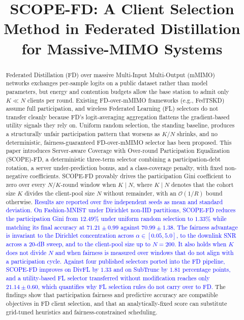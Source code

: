 \documentclass[journal]{IEEEtran}
\newcommand{\revIVE}[1]{#1}
\newcommand{\rev}[1]{\textcolor{blue}{#1}}
\begin{document}
\title{SCOPE-FD: A Client Selection Method in Federated Distillation for Massive-MIMO Systems}

\author{
}

\maketitle

\begin{abstract}
\revIVE{Federated Distillation (FD) over massive Multi-Input Multi-Output (mMIMO) networks exchanges per-sample logits on a public dataset rather than model parameters, but energy and contention budgets allow the base station to admit only $K \ll N$ clients per round. Existing FD-over-mMIMO frameworks (e.g., FedTSKD) assume full participation, and wireless Federated Learning (FL) selectors do not transfer cleanly because FD's logit-averaging aggregation flattens the gradient-based utility signals they rely on. Uniform random selection, the standing baseline, produces a structurally unfair participation pattern that worsens as $K/N$ shrinks, and no deterministic, fairness-guaranteed FD-over-mMIMO selector has been proposed. This paper introduces Server-aware Coverage with Over-round Participation Equalization (SCOPE)-FD, a deterministic three-term selector combining a participation-debt rotation, a server under-prediction bonus, and a class-coverage penalty, with fixed non-negative coefficients. SCOPE-FD provably drives the participation Gini coefficient to zero over every $N/K$-round window when $K \mid N$, where $K \mid N$ denotes that the cohort size $K$ divides the client-pool size $N$ without remainder, with an $\mathcal{O}(1/R)$ bound otherwise. \rev{Results are reported over five independent seeds as mean and standard deviation. On Fashion-MNIST under Dirichlet non-IID partitions, SCOPE-FD reduces the participation Gini from $12.49\%$ under uniform random selection to $1.33\%$ while matching its final accuracy at $71.21 \pm 0.99$ against $70.99 \pm 1.38$. The fairness advantage is invariant to the Dirichlet concentration across $\alpha \in [0.05, 5.0]$, to the downlink SNR across a $20$-dB sweep, and to the client-pool size up to $N = 200$. It also holds when $K$ does not divide $N$ and when fairness is measured over windows that do not align with a participation cycle. Against four published selectors ported into the FD pipeline, SCOPE-FD improves on DivFL by $1.33$ and on SubTrunc by $1.81$ percentage points, and a utility-based FL selector transferred without modification reaches only $21.14 \pm 0.60$, which quantifies why FL selection rules do not carry over to FD.} The findings show that participation fairness and predictive accuracy are compatible objectives in FD client selection, and that an analytically-fixed score can substitute grid-tuned heuristics and fairness-constrained scheduling. }

\end{abstract}
\end{document}
